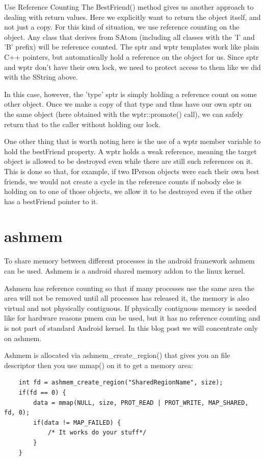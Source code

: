 \documentclass[a4paper,11pt]{article}
\begin{document}
Use Reference Counting
The BestFriend() method gives us another approach to dealing with return values. Here we explicitly want to return the object itself, and not just a copy. For this kind of situation, we use reference counting on the object.
Any class that derives from SAtom (including all classes with the 'I' and 'B' prefix) will be reference counted. The sptr and wptr templates work like plain C++ pointers, but automatically hold a reference on the object for us. Since sptr and wptr don't have their own lock, we need to protect access to them like we did with the SString above.

In this case, however, the 'type' sptr is simply holding a reference count on some other object. Once we make a copy of that type and thus have our own sptr on the same object (here obtained with the wptr::promote() call), we can safely return that to the caller without holding our lock.

One other thing that is worth noting here is the use of a wptr member variable to hold the bestFriend property. A wptr holds a weak reference, meaning the target object is allowed to be destroyed even while there are still such references on it. This is done so that, for example, if two IPerson objects were each their own best friends, we would not create a cycle in the reference counts if nobody else is holding on to one of those objects, we allow it to be destroyed even if the other has a bestFriend pointer to it.


\section{ashmem}
To share memory between different processes in the android framework ashmem
can be used. Ashmem is a android shared memory addon to the linux kernel. 

Ashmem has reference counting so that if many processes use the same area the
area will not be removed until all processes has released it, the memory is
also virtual and not physically contiguous. If physically contiguous memory is
needed like for hardware reasons pmem can be used, but it has no reference
counting and is not part of standard Android kernel. 
In this blog post we will concentrate only on ashmem.

Ashmem is allocated via ashmem_create_region() that gives you an file
descriptor then you use mmap() on it to get a memory area:
\begin{lstlisting}
    int fd = ashmem_create_region("SharedRegionName", size);
    if(fd == 0) {
        data = mmap(NULL, size, PROT_READ | PROT_WRITE, MAP_SHARED, fd, 0);
        if(data != MAP_FAILED) {
            /* It works do your stuff*/
        }
    }
\end{lstlisting}
\end{document}
